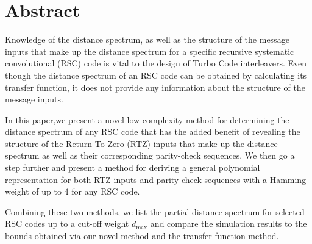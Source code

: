 \section{Abstract}
Knowledge of the distance spectrum, as well as the structure of the message inputs that make up the distance spectrum for a specific recursive systematic convolutional (RSC) code is vital to the design of Turbo Code interleavers. Even though the distance spectrum of an RSC code can be obtained by calculating its transfer function, it does not provide any information about the structure of the message inputs. %

In this paper,we present a novel low-complexity method for determining the distance spectrum of any RSC code that has the added benefit of revealing the structure of the Return-To-Zero (RTZ) inputs that make up the distance spectrum as well as their corresponding parity-check sequences. 
We then go a step further and present a method  for deriving a general polynomial representation for both RTZ inputs and parity-check sequences with a Hamming weight of up to $4$ for any RSC code.
 
 Combining these two methods, we list the partial distance spectrum for selected RSC codes up to a cut-off weight $d_{\text{max}}$ and compare the simulation results to the bounds obtained via our novel method and the transfer function method.
